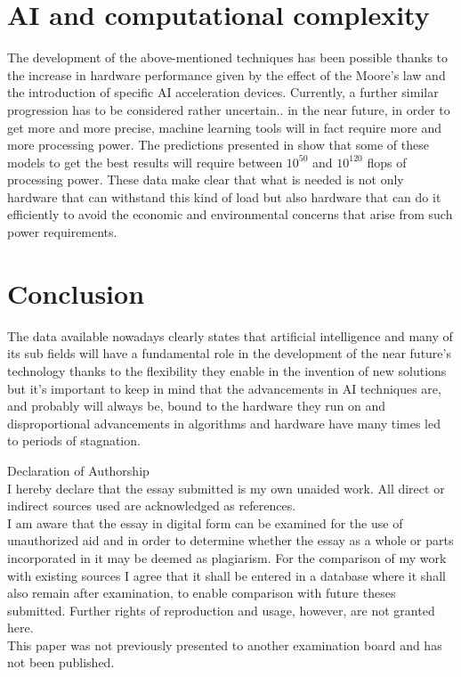 \documentclass{article}
\begin{document}
\section{AI and  computational complexity}

The development of the above-mentioned techniques has been possible thanks
to the increase in hardware performance given by the effect of the Moore's
law and the introduction of specific AI acceleration devices.
Currently, a further similar progression has to be considered rather
uncertain.. 
in the near future, in order to get more and more precise, machine learning
tools will in fact require more and more processing power.
The predictions presented in \cite{comp}  show that some of these models to get the
best results will require between $10^{50}$ and $ 10^{120} $ flops of
processing power.
These data make clear that what is needed is not only hardware that can
withstand this kind of load but also hardware that can do it efficiently
to avoid the economic and environmental concerns that arise from such power
requirements.

\section{Conclusion}

The data available nowadays clearly states that artificial intelligence and
many of its sub fields will have a fundamental role in the development of
the near future's technology thanks to the flexibility they enable in the
invention of new solutions but it's important to keep in mind that the
advancements in AI techniques are, and probably will always be, bound to the
hardware they run on and disproportional advancements in algorithms and
hardware have many times led to periods of stagnation.






\newpage
Declaration of Authorship\\
I hereby declare that the essay submitted is my own unaided work.
All direct or indirect sources used are
acknowledged as references.\\
I am aware that the essay in digital form can be examined for the use
of unauthorized aid and in order to
determine whether the essay as a whole or parts incorporated in it may
be deemed as plagiarism. For the
comparison of my work with existing sources I agree that it shall be
entered in a database where it shall
also remain after examination, to enable comparison with future theses
submitted. Further rights of
reproduction and usage, however, are not granted here.\\
This paper was not previously presented to another examination board and has not been published.
\end{document}
